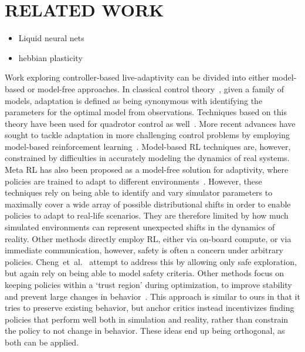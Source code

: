 \documentclass[letterpaper, 10 pt, conference]{ieeeconf} %
\begin{document}
\section{RELATED WORK}   
    \begin{itemize}
        \item Liquid neural nets
        \item hebbian plasticity
    \end{itemize}
    Work exploring controller-based live-adaptivity can be divided into either model-based or model-free approaches. 
    In classical control theory~\cite{PasikDuncan1996AdaptiveC}, given a family of models, adaptation is defined as being synonymous with identifying the parameters for the optimal model from observations. 
    Techniques based on this theory have been used for quadrotor control as well~\cite{model_quad_adapt}. 
    More recent advances have sought to tackle adaptation in more challenging control problems by employing model-based reinforcement learning~\cite{Song2020ProvablyEM}. 
    Model-based RL techniques are, however, constrained by difficulties in accurately modeling the dynamics of real systems.
    Meta RL has also been proposed as a model-free solution for adaptivity, where policies are trained to adapt to different environments~\cite{MetaSimToReal, Nagabandi2019LearningTA, Dextrous}. 
    However, these techniques rely on being able to identify and vary simulator parameters to maximally cover a wide array of possible distributional shifts in order to enable policies to adapt to real-life scenarios. 
    They are therefore limited by how much simulated environments can represent unexpected shifts in the dynamics of reality. 
    Other methods directly employ RL, either via on-board compute, or via immediate communication, however, safety is often a concern under arbitrary policies. 
    Cheng~et~al.~\cite{Cheng_Orosz_Murray_Burdick_2019} attempt to address this by allowing only safe exploration, but again rely on being able to model safety criteria. 
    Other methods focus on keeping policies within a `trust region' during optimization, to improve stability and prevent large changes in behavior~\cite{TRPO,PPO}. This approach is similar to ours in that it tries to preserve existing behavior, but anchor critics instead incentivizes finding policies that perform well both in simulation and reality, rather than constrain the policy to not change in behavior. These ideas end up being orthogonal, as both can be applied.
\end{document}
